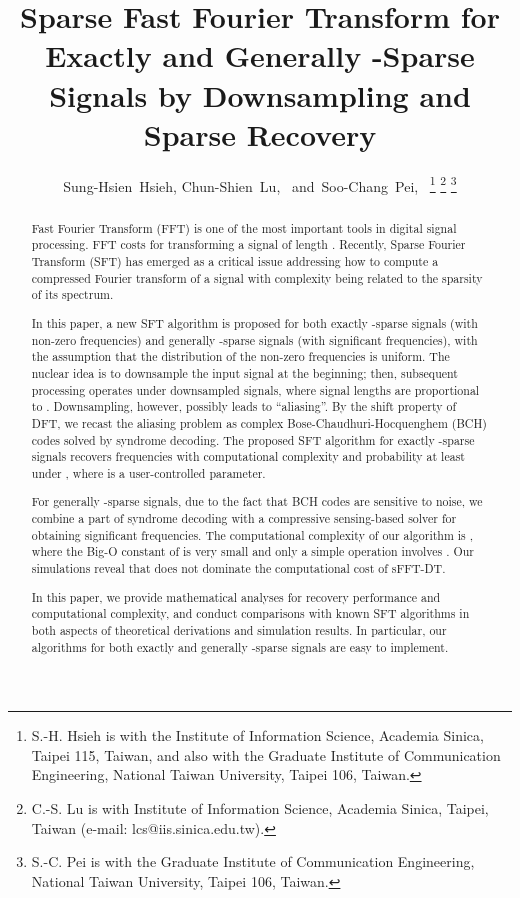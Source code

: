 \documentclass[journal,onecolumn,11pt]{IEEEtran}
\begin{document}
\title{ Sparse Fast Fourier Transform for Exactly and Generally -Sparse Signals by Downsampling and Sparse Recovery}
\author{Sung-Hsien~Hsieh,
        Chun-Shien~Lu,~
        and~Soo-Chang~Pei,~ \thanks{S.-H. Hsieh is with the Institute of Information Science, Academia Sinica,
Taipei 115, Taiwan, and also with the Graduate Institute of Communication Engineering, National Taiwan University, Taipei 106, Taiwan.}
\thanks{C.-S. Lu is with Institute of Information Science, Academia Sinica, Taipei,
Taiwan (e-mail: lcs@iis.sinica.edu.tw).}
\thanks{S.-C. Pei is with the Graduate Institute of Communication Engineering,
National Taiwan University, Taipei 106, Taiwan.}
}


\markboth{}{}



\maketitle

\begin{abstract}
Fast Fourier Transform (FFT) is one of the most important tools in digital signal processing.
FFT costs  for transforming a signal of length .
Recently, Sparse Fourier Transform (SFT) has emerged as a critical issue addressing how to compute a compressed Fourier transform of a signal with complexity being related to the sparsity of its spectrum.

In this paper, a new SFT algorithm is proposed for both exactly -sparse signals (with  non-zero frequencies) and generally -sparse signals (with  significant frequencies), with the assumption that the distribution of the non-zero frequencies is uniform.
The nuclear idea is to downsample the input signal at the beginning; then, subsequent processing operates under downsampled signals, where signal lengths are proportional to .
Downsampling, however, possibly leads to ``aliasing''.
By the shift property of DFT, we recast the aliasing problem as complex Bose-Chaudhuri-Hocquenghem (BCH) codes solved by syndrome decoding.
The proposed SFT algorithm for exactly -sparse signals recovers  frequencies with computational complexity  and probability at least  under , where  is a user-controlled parameter.

For generally -sparse signals, due to the fact that BCH codes are sensitive to noise, we combine a part of syndrome decoding with a compressive sensing-based solver for obtaining  significant frequencies.
The computational complexity of our algorithm is , where the Big-O constant of  is very small and only a simple operation involves .
Our simulations reveal that  does not dominate the computational cost of sFFT-DT.

In this paper, we provide mathematical analyses for recovery performance and computational complexity, and conduct comparisons with known SFT algorithms in both aspects of theoretical derivations and simulation results.
In particular, our algorithms for both exactly and generally -sparse signals are easy to implement.
\end{abstract}
\end{document}
